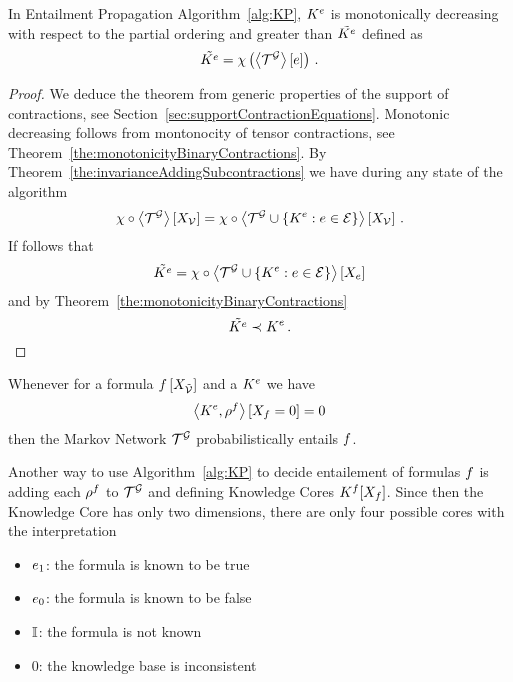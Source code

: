 \begin{theorem}
	In Entailment Propagation Algorithm~\ref{alg:KP}, $K^{e}$ is monotonically decreasing with respect to the partial ordering and greater than $\tilde{K^{e}}$ defined as
			\[ \tilde{K^{e}} = \chi\left(\left\langle \mathcal{T}^{\mathcal{G}}\right\rangle \left[ e \right]\right) \, . \]
\end{theorem}
\begin{proof}
	We deduce the theorem from generic properties of the support of contractions, see Section~\ref{sec:supportContractionEquations}.
	Monotonic decreasing follows from montonocity of tensor contractions, see Theorem~\ref{the:monotonicityBinaryContractions}.
	By Theorem~\ref{the:invarianceAddingSubcontractions} we have during any state of the algorithm 
		\[ \chi\circ\left\langle \mathcal{T}^{\mathcal{G}}\right\rangle \left[ X_{\mathcal{V}} \right]  =  
		\chi\circ\left\langle \mathcal{T}^{\mathcal{G}}\cup\{K^{e} : e\in\mathcal{E}\}\right\rangle \left[ X_{\mathcal{V}} \right]  \, . 
		\]
	If follows that
		\[ \tilde{K^{e}} =  \chi\circ\left\langle \mathcal{T}^{\mathcal{G}}\cup\{K^{e} : e\in\mathcal{E}\}\right\rangle \left[ X_{e} \right] \]
	and by Theorem~\ref{the:monotonicityBinaryContractions}
		\[  \tilde{K^{e}}  \prec K^{e} \, . \]
\end{proof}


\begin{corollary}
	Whenever for a formula $f\left[X_{\tilde{\mathcal{V}}}\right]$ and a $K^{e}$ we have
		\[ \left\langle K^{e},\rho^{f}\right\rangle \left[ X_{f}=0 \right] =0  \]
	then the Markov Network $\mathcal{T}^{\mathcal{G}}$ probabilistically entails $f$.
\end{corollary}


Another way to use Algorithm~\ref{alg:KP} to decide entailement of formulas $f$ is adding each $\rho^{f}$ to $\mathcal{T}^{\mathcal{G}}$ and defining Knowledge Cores $K^{f}[X_{f}]$.
Since then the Knowledge Core has only two dimensions, there are only four possible cores with the interpretation
\begin{itemize}
	\item $e_1$: the formula is known to be true
	\item $e_0$: the formula is known to be false
	\item $\mathbb{I}$: the formula is not known
	\item $0$: the knowledge base is inconsistent
\end{itemize}


